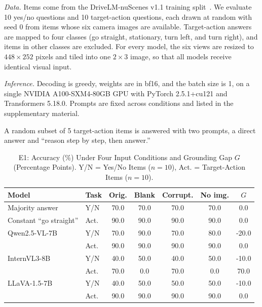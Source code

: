 \textit{Data.} Items come from the DriveLM-nuScenes v1.1 training split~\cite{sima2024drivelm}. We evaluate 10 yes/no questions and 10 target-action questions, each drawn at random with seed 0 from items whose six camera images are available. Target-action answers are mapped to four classes (go straight, stationary, turn left, and turn right), and items in other classes are excluded. For every model, the six views are resized to $448\times252$ pixels and tiled into one $2\times3$ image, so that all models receive identical visual input.

\textit{Inference.} Decoding is greedy, weights are in bf16, and the batch size is 1, on a single NVIDIA A100-SXM4-80GB GPU with PyTorch 2.5.1+cu121 and Transformers 5.18.0. Prompts are fixed across conditions and listed in the supplementary material.

A random subset of 5 target-action items is answered with two prompts, a direct answer and ``reason step by step, then answer.''

\begin{table}[t]
\centering
\caption{E1: Accuracy (\%) Under Four Input Conditions and Grounding Gap $G$ (Percentage Points). Y/N = Yes/No Items ($n=10$), Act. = Target-Action Items ($n=10$).}
\label{tab:cs_e1}
\scriptsize
\renewcommand{\arraystretch}{1.12}
\begin{tabular}{@{}l l c c c c c@{}}
\toprule
\textbf{Model} & \textbf{Task} & \textbf{Orig.} & \textbf{Blank} & \textbf{Corrupt.} & \textbf{No img.} & $G$ \\
\midrule
Majority answer & Y/N & 70.0 & 70.0 & 70.0 & 70.0 & 0.0 \\
Constant ``go straight'' & Act. & 90.0 & 90.0 & 90.0 & 90.0 & 0.0 \\
\midrule
Qwen2.5-VL-7B & Y/N & 70.0 & 90.0 & 70.0 & 80.0 & -20.0 \\
 & Act. & 90.0 & 90.0 & 90.0 & 90.0 & 0.0 \\
InternVL3-8B & Y/N & 40.0 & 50.0 & 40.0 & 50.0 & -10.0 \\
 & Act. & 70.0 & 0.0 & 70.0 & 0.0 & 70.0 \\
LLaVA-1.5-7B & Y/N & 40.0 & 50.0 & 50.0 & 50.0 & -10.0 \\
 & Act. & 90.0 & 90.0 & 90.0 & 90.0 & 0.0 \\
\bottomrule
\end{tabular}
\end{table}

